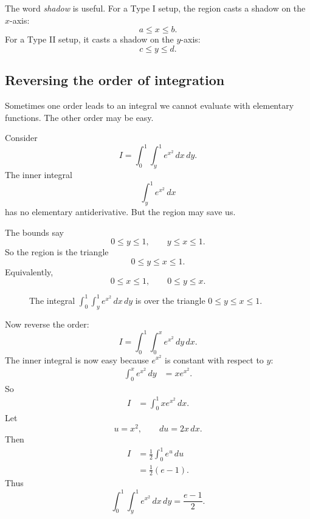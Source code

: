 The word \emph{shadow} is useful.  For a Type I setup, the region casts a shadow on the
\(x\)-axis:
\[
    a\le x\le b.
\]
For a Type II setup, it casts a shadow on the \(y\)-axis:
\[
    c\le y\le d.
\]

\subsection{Reversing the order of integration}

Sometimes one order leads to an integral we cannot evaluate with elementary functions.
The other order may be easy.

Consider
\[
    I=
    \int_0^1\int_y^1 e^{x^2}\,dx\,dy.
\]
The inner integral
\[
    \int_y^1 e^{x^2}\,dx
\]
has no elementary antiderivative.  But the region may save us.

The bounds say
\[
    0\le y\le1,
    \qquad
    y\le x\le1.
\]
So the region is the triangle
\[
    0\le y\le x\le1.
\]
Equivalently,
\[
    0\le x\le1,
    \qquad
    0\le y\le x.
\]

\begin{figure}[h]
\centering
{}
\caption{The integral \(\int_0^1\int_y^1 e^{x^2}\,dx\,dy\) is over the triangle
\(0\le y\le x\le1\).}
\end{figure}

Now reverse the order:
\[
    I=
    \int_0^1\int_0^x e^{x^2}\,dy\,dx.
\]
The inner integral is now easy because \(e^{x^2}\) is constant with respect to \(y\):
\[
\begin{aligned}
    \int_0^x e^{x^2}\,dy
    &=
    xe^{x^2}.
\end{aligned}
\]
So
\[
\begin{aligned}
    I
    &=
    \int_0^1 xe^{x^2}\,dx.
\end{aligned}
\]
Let
\[
    u=x^2,
    \qquad
    du=2x\,dx.
\]
Then
\[
\begin{aligned}
    I
    &=
    \frac12\int_0^1 e^u\,du\\
    &=
    \frac12(e-1).
\end{aligned}
\]
Thus
\[
\boxed{
    \int_0^1\int_y^1 e^{x^2}\,dx\,dy
    =
    \frac{e-1}{2}.
}
\]

